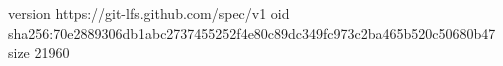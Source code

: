 version https://git-lfs.github.com/spec/v1
oid sha256:70e2889306db1abc2737455252f4e80c89dc349fc973c2ba465b520c50680b47
size 21960
